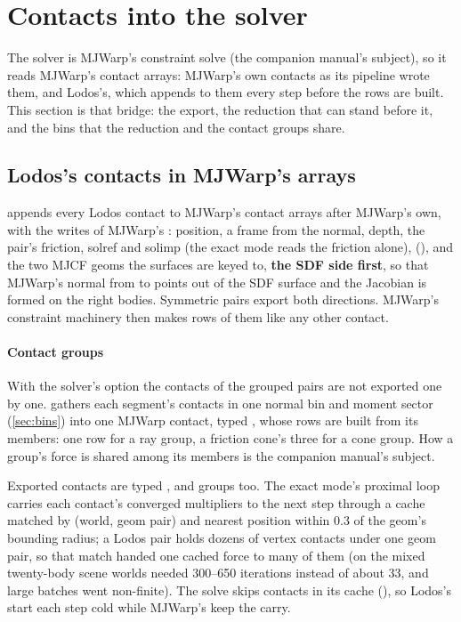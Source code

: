 \section{Contacts into the solver}\label{sec:bridges}

The solver is MJWarp's constraint solve (the companion manual's subject), so it reads MJWarp's contact arrays: MJWarp's own contacts as its pipeline wrote them, and Lodos's, which  appends to them every step before the rows are built. This section is that bridge: the export, the reduction that can stand before it, and the bins that the reduction and the contact groups share.

\subsection{Lodos's contacts in MJWarp's arrays}\label{sec:export}

 appends every Lodos contact to MJWarp's contact arrays after MJWarp's own, with the writes of MJWarp's : position, a frame from the normal, depth, the pair's friction, solref and solimp (the exact mode reads the friction alone),  (), and the two MJCF geoms the surfaces are keyed to, \textbf{the SDF side first}, so that MJWarp's normal from  to  points out of the SDF surface and the Jacobian is formed on the right bodies. Symmetric pairs export both directions. MJWarp's constraint machinery then makes rows of them like any other contact.

\paragraph{Contact groups} With the solver's  option the contacts of the grouped pairs are not exported one by one.  gathers each segment's contacts in one normal bin and moment sector (\cref{sec:bins}) into one MJWarp contact, typed , whose rows are built from its members: one row for a ray group, a friction cone's three for a cone group. How a group's force is shared among its members is the companion manual's subject.

Exported contacts are typed , and groups  too. The exact mode's proximal loop carries each contact's converged multipliers to the next step through a cache matched by (world, geom pair) and nearest position within 0.3 of the geom's bounding radius; a Lodos pair holds dozens of vertex contacts under one geom pair, so that match handed one cached force to many of them (on the mixed twenty-body scene worlds needed 300--650 iterations instead of about 33, and large batches went non-finite). The solve skips  contacts in its cache (), so Lodos's start each step cold while MJWarp's keep the carry.

